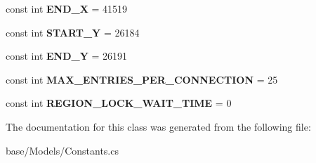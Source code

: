 \begin{DoxyCompactItemize}
\item 
\hypertarget{classCore_1_1Models_1_1Constants_ab564a2138347d9c65862ffe4d80c6735}{const int {\bfseries E\-N\-D\-\_\-\-X} = 41519}\label{classCore_1_1Models_1_1Constants_ab564a2138347d9c65862ffe4d80c6735}

\item 
\hypertarget{classCore_1_1Models_1_1Constants_a0da8b0008fff8b2529d5a8e298b29e5f}{const int {\bfseries S\-T\-A\-R\-T\-\_\-\-Y} = 26184}\label{classCore_1_1Models_1_1Constants_a0da8b0008fff8b2529d5a8e298b29e5f}

\item 
\hypertarget{classCore_1_1Models_1_1Constants_ae2cd96ff453731f63095739737f184b4}{const int {\bfseries E\-N\-D\-\_\-\-Y} = 26191}\label{classCore_1_1Models_1_1Constants_ae2cd96ff453731f63095739737f184b4}

\item 
\hypertarget{classCore_1_1Models_1_1Constants_a09b8f7514cdf1d440f7bbaff8fe843c2}{const int {\bfseries M\-A\-X\-\_\-\-E\-N\-T\-R\-I\-E\-S\-\_\-\-P\-E\-R\-\_\-\-C\-O\-N\-N\-E\-C\-T\-I\-O\-N} = 25}\label{classCore_1_1Models_1_1Constants_a09b8f7514cdf1d440f7bbaff8fe843c2}

\item 
\hypertarget{classCore_1_1Models_1_1Constants_ae34c70369e0c6c6f34f5b5275625afdb}{const int {\bfseries R\-E\-G\-I\-O\-N\-\_\-\-L\-O\-C\-K\-\_\-\-W\-A\-I\-T\-\_\-\-T\-I\-M\-E} = 0}\label{classCore_1_1Models_1_1Constants_ae34c70369e0c6c6f34f5b5275625afdb}

\end{DoxyCompactItemize}


The documentation for this class was generated from the following file\-:\begin{DoxyCompactItemize}
\item 
base/\-Models/Constants.\-cs\end{DoxyCompactItemize}
